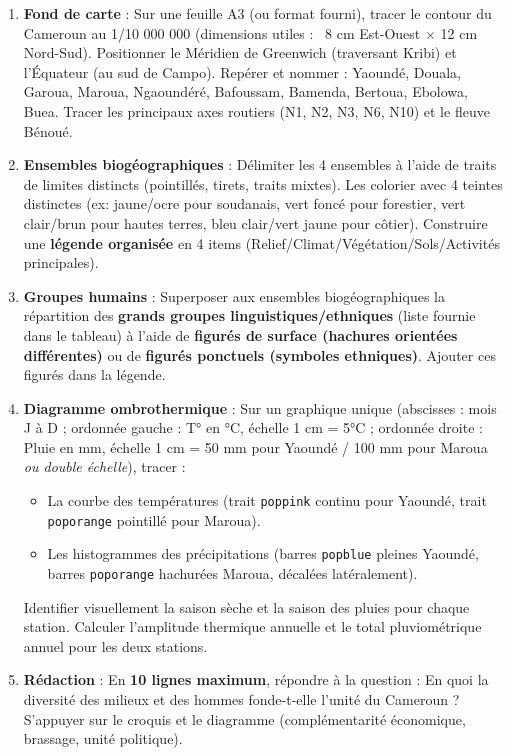 \documentclass[11pt]{article}
\newcounter{popsec}
\newcounter{popsub}
\newcommand{\courssub}[1]{%
  \stepcounter{popsub}%
  \par\vspace{9pt}\noindent{\popxbold\fontsize{11.5}{13}\selectfont\color{popink}{\color{poporange}\thepopsec.\thepopsub}\hspace{6pt}#1}\par\nopagebreak\vspace{4pt}
}
\begin{document}
\courssub{Consignes du travail}
\begin{enumerate}
    \item \textbf{Fond de carte} : Sur une feuille A3 (ou format fourni), tracer le contour du Cameroun au 1/10 000 000 (dimensions utiles : ~8 cm Est-Ouest $\times$ 12 cm Nord-Sud). Positionner le Méridien de Greenwich (traversant Kribi) et l'Équateur (au sud de Campo). Repérer et nommer : Yaoundé, Douala, Garoua, Maroua, Ngaoundéré, Bafoussam, Bamenda, Bertoua, Ebolowa, Buea. Tracer les principaux axes routiers (N1, N2, N3, N6, N10) et le fleuve Bénoué.
    \item \textbf{Ensembles biogéographiques} : Délimiter les 4 ensembles à l'aide de traits de limites distincts (pointillés, tirets, traits mixtes). Les colorier avec 4 teintes distinctes (ex: jaune/ocre pour soudanais, vert foncé pour forestier, vert clair/brun pour hautes terres, bleu clair/vert jaune pour côtier). Construire une \textbf{légende organisée} en 4 items (Relief/Climat/Végétation/Sols/Activités principales).
    \item \textbf{Groupes humains} : Superposer aux ensembles biogéographiques la répartition des \textbf{grands groupes linguistiques/ethniques} (liste fournie dans le tableau) à l'aide de \textbf{figurés de surface (hachures orientées différentes)} ou de \textbf{figurés ponctuels (symboles ethniques)}. Ajouter ces figurés dans la légende.
    \item \textbf{Diagramme ombrothermique} : Sur un graphique unique (abscisses : mois J à D ; ordonnée gauche : T° en °C, échelle 1 cm = 5°C ; ordonnée droite : Pluie en mm, échelle 1 cm = 50 mm pour Yaoundé / 100 mm pour Maroua \emph{ou double échelle}), tracer :
        \begin{itemize}
            \item La courbe des températures (trait \texttt{poppink} continu pour Yaoundé, trait \texttt{poporange} pointillé pour Maroua).
            \item Les histogrammes des précipitations (barres \texttt{popblue} pleines Yaoundé, barres \texttt{poporange} hachurées Maroua, décalées latéralement).
        \end{itemize}
        Identifier visuellement la saison sèche et la saison des pluies pour chaque station. Calculer l'amplitude thermique annuelle et le total pluviométrique annuel pour les deux stations.
    \item \textbf{Rédaction} : En \textbf{10 lignes maximum}, répondre à la question : \og En quoi la diversité des milieux et des hommes fonde-t-elle l'unité du Cameroun ? \fg{} S'appuyer sur le croquis et le diagramme (complémentarité économique, brassage, unité politique).
\end{enumerate}
\end{document}
